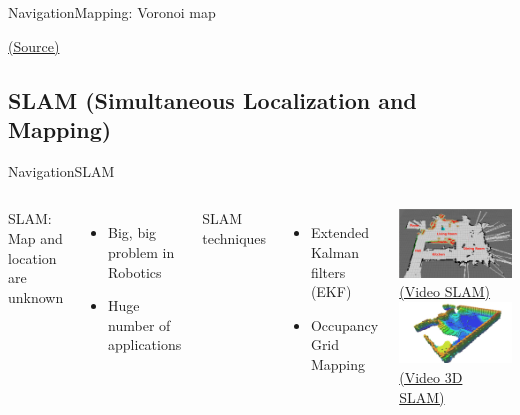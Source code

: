 \documentclass[10pt,compress]{beamer} %
\begin{document}
\begin{frame}{Navigation}{Mapping: Voronoi map}
	\begin{center}
		\tiny{\href{https://upload.wikimedia.org/wikipedia/commons/5/54/Euclidean_Voronoi_diagram.svg}{(Source)}}
	\end{center}
\end{frame}

\subsection{SLAM (Simultaneous Localization and Mapping)}

\begin{frame}{Navigation}{SLAM}
	\begin{columns}
		SLAM: Map and location are unknown
		\begin{itemize}
			\item Big, big problem in Robotics
			\item Huge number of applications
		\end{itemize}
		SLAM techniques
		\begin{itemize}
			\item Extended Kalman filters (EKF)
			\item Occupancy Grid Mapping
		\end{itemize}

			\centering\includegraphics[width=\linewidth]{figs/slam2d.png}\\
			\tiny{\href{https://www.youtube.com/watch?v=17W8dkzkvWA}{(Video SLAM)}}
			\bigskip
			\centering\includegraphics[width=\linewidth]{figs/slam3d.jpg}\\
			\tiny{\href{https://www.youtube.com/watch?v=qpTS7kg9J3A}{(Video 3D SLAM)}}
	\end{columns}

\end{frame}
\end{document}
